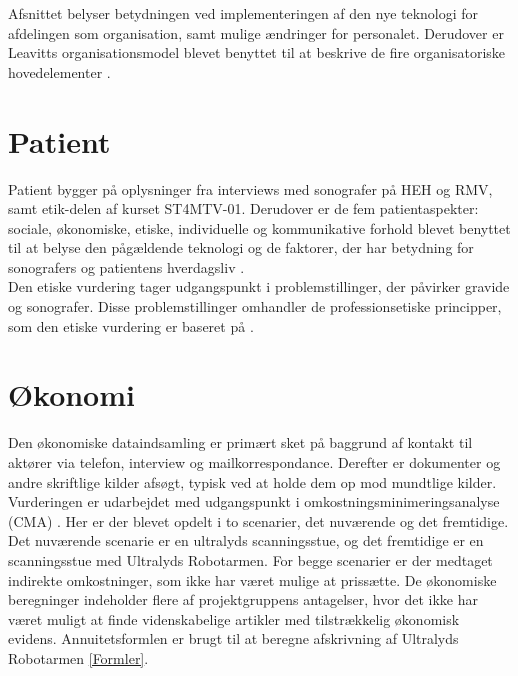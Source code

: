 Afsnittet belyser betydningen ved implementeringen af den nye teknologi for afdelingen som organisation, samt mulige ændringer for personalet. Derudover er Leavitts organisationsmodel blevet benyttet til at beskrive de fire organisatoriske hovedelementer \cite{Leavitt}.

\section{Patient}
Patient bygger på oplysninger fra interviews med sonografer på HEH og RMV, samt etik-delen af kurset ST4MTV-01. Derudover er de fem patientaspekter: sociale, økonomiske, etiske, individuelle og kommunikative forhold blevet benyttet til at belyse den pågældende teknologi og de faktorer, der har betydning for sonografers og patientens hverdagsliv \cite{Leavitt}.\\ 
Den etiske vurdering tager udgangspunkt i problemstillinger, der påvirker gravide og sonografer. Disse problemstillinger omhandler de professionsetiske principper, som den etiske vurdering er baseret på \cite{Husted} \cite{Etiskehjul}.

\section{Økonomi}
Den økonomiske dataindsamling er primært sket på baggrund af kontakt til aktører via telefon, interview og mailkorrespondance. Derefter er dokumenter og andre skriftlige kilder afsøgt, typisk ved at holde dem op mod mundtlige kilder. Vurderingen er udarbejdet med udgangspunkt i omkostningsminimeringsanalyse (CMA) \cite{Leavitt}. Her er der blevet opdelt i to scenarier, det nuværende og det fremtidige. Det nuværende scenarie er en ultralyds scanningsstue, og det fremtidige er en scanningsstue med Ultralyds Robotarmen. For begge scenarier er der medtaget indirekte omkostninger, som ikke har været mulige at prissætte. De økonomiske beregninger indeholder flere af projektgruppens antagelser, hvor det ikke har været muligt at finde videnskabelige artikler med tilstrækkelig økonomisk evidens. Annuitetsformlen er brugt til at beregne afskrivning af Ultralyds Robotarmen \ref{Formler}. 